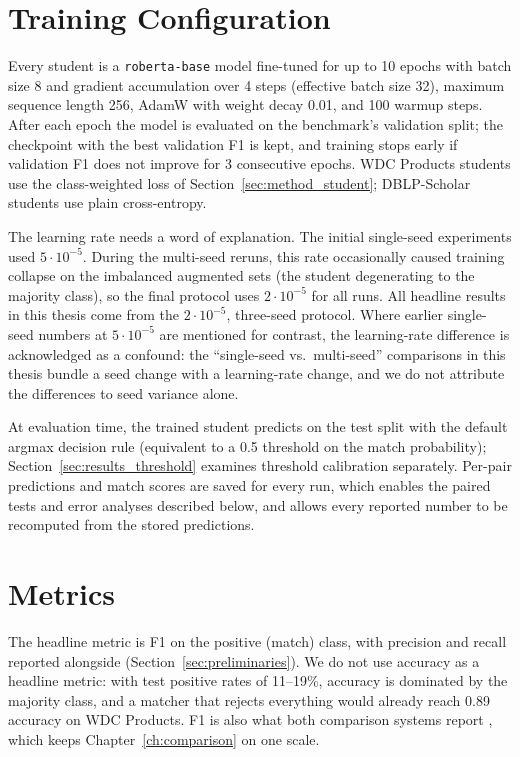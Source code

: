 \documentclass[a4paper,oneside,bibliography=totoc]{scrbook}
\begin{document}
\section{Training Configuration}
\label{sec:setup_training}

Every student is a \texttt{roberta-base} model fine-tuned for up to 10 epochs with batch size 8 and gradient accumulation over 4 steps (effective batch size 32), maximum sequence length 256, AdamW with weight decay 0.01, and 100 warmup steps. After each epoch the model is evaluated on the benchmark's validation split; the checkpoint with the best validation F1 is kept, and training stops early if validation F1 does not improve for 3 consecutive epochs. WDC Products students use the class-weighted loss of Section~\ref{sec:method_student}; DBLP-Scholar students use plain cross-entropy.

The learning rate needs a word of explanation. The initial single-seed experiments used $5 \cdot 10^{-5}$. During the multi-seed reruns, this rate occasionally caused training collapse on the imbalanced augmented sets (the student degenerating to the majority class), so the final protocol uses $2 \cdot 10^{-5}$ for all runs. All headline results in this thesis come from the $2 \cdot 10^{-5}$, three-seed protocol. Where earlier single-seed numbers at $5 \cdot 10^{-5}$ are mentioned for contrast, the learning-rate difference is acknowledged as a confound: the ``single-seed vs.\ multi-seed'' comparisons in this thesis bundle a seed change with a learning-rate change, and we do not attribute the differences to seed variance alone.

At evaluation time, the trained student predicts on the test split with the default argmax decision rule (equivalent to a 0.5 threshold on the match probability); Section~\ref{sec:results_threshold} examines threshold calibration separately. Per-pair predictions and match scores are saved for every run, which enables the paired tests and error analyses described below, and allows every reported number to be recomputed from the stored predictions.

\section{Metrics}
\label{sec:setup_metrics}

The headline metric is F1 on the positive (match) class, with precision and recall reported alongside (Section~\ref{sec:preliminaries}). We do not use accuracy as a headline metric: with test positive rates of 11--19\%, accuracy is dominated by the majority class, and a matcher that rejects everything would already reach 0.89 accuracy on WDC Products. F1 is also what both comparison systems report \cite{zeakis2026distiller,steiner2026labeling}, which keeps Chapter~\ref{ch:comparison} on one scale.
\end{document}

